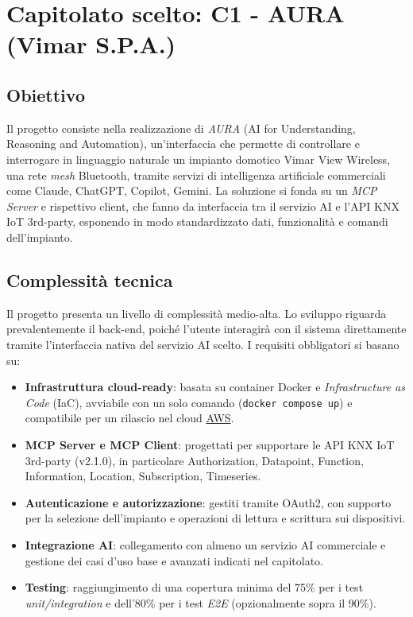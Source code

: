 \documentclass[11pt, a4paper]{article}
\begin{document}
\tableofcontents
\newpage

\pagestyle{fancy}
\section{Capitolato scelto: C1 - AURA (Vimar S.P.A.)}
\subsection{Obiettivo}
Il progetto consiste nella realizzazione di \textit{AURA} (AI for Understanding, Reasoning and Automation), un'interfaccia che permette di controllare e interrogare in linguaggio naturale un impianto domotico Vimar View Wireless, una rete \textit{mesh} Bluetooth, tramite servizi di intelligenza artificiale commerciali come Claude, ChatGPT, Copilot, Gemini. La soluzione si fonda su un \textit{MCP Server} e rispettivo client, che fanno da interfaccia tra il servizio AI e l'API KNX IoT 3rd-party, esponendo in modo standardizzato dati, funzionalità e comandi dell'impianto. 

\subsection{Complessità tecnica}
Il progetto presenta un livello di complessità medio-alta. Lo sviluppo riguarda prevalentemente il back-end, poiché l'utente interagirà con il sistema direttamente tramite l'interfaccia nativa del servizio AI scelto. I requisiti obbligatori si basano su:
\begin{itemize}
    \item \textbf{Infrastruttura cloud-ready}: basata su container Docker e \textit{Infrastructure as Code} (IaC), avviabile con un solo comando (\texttt{docker compose up}) e compatibile per un rilascio nel cloud \href{https://aws.amazon.com/it/}{AWS}.
    \item \textbf{MCP Server e MCP Client}: progettati per supportare le API KNX IoT 3rd-party (v2.1.0), in particolare Authorization, Datapoint, Function, Information, Location, Subscription, Timeseries.
    \item \textbf{Autenticazione e autorizzazione}: gestiti tramite OAuth2, con supporto per la selezione dell'impianto e operazioni di lettura e scrittura sui dispositivi.
    \item \textbf{Integrazione AI}: collegamento con almeno un servizio AI commerciale e gestione dei casi d'uso base e avanzati indicati nel capitolato.
    \item \textbf{Testing}: raggiungimento di una copertura minima del 75\% per i test \textit{unit/integration} e dell'80\% per i test \textit{E2E} (opzionalmente sopra il 90\%).
\end{itemize}
\end{document}
